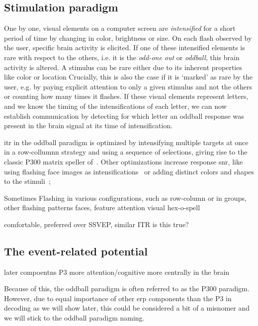 \subsection{Stimulation paradigm}
One by one, visual elements on a computer screen are \emph{intensified} for a
short period of time by changing in color, brightness or size.
On each flash observed by the user, specific brain activity is elicited.
If one of these intensified elements is rare with respect to the others, i.e. it is the
\emph{odd-one out} or \emph{oddball}, this brain activity is altered.
A stimulus can be rare either due to its inherent properties like color or
location
Crucially, this is also the case if it is `marked' as rare by the user, e.g.
by paying explicit attention to only a given stimulus and not the others or
counting how many times it flashes.
If these visual elements represent letters, and we know the timing of the
intensifications of each letter, we can now establish communication by detecting
for which letter an oddball response was present in the brain signal at its
time of intensification.

\Ac{itr} in the oddball paradigm is optimized by intensifying
multiple targets at once in a row-collumnn strategy and using a sequence of
selections, giving rise to the classic
P300 matrix speller of~\cite{Farwell1988}.
Other optimizations increase response \ac{snr}, like using flashing face
images as intensifications~\cite{Jin2012} or adding distinct colors and shapes to the
stimuli~\cite{Treder2011};

Sometimes Flashing in various configurations, such as row-column or in groups,
other flashing patterns
faces, feature attention
visual hex-o-spell

comfortable, preferred over SSVEP, similar ITR is this true?

\subsection{The event-related potential}


later compoentns P3 more attention/cognitive more centrally in the brain

Because of this, the oddball paradigm is often referred to as the P300
paradigm.
However, due to equal importance of other \ac{erp} components than the P3 in
decoding as we will show later, this could be considered a bit of a misnomer
and we will stick to the oddball paradigm naming.

